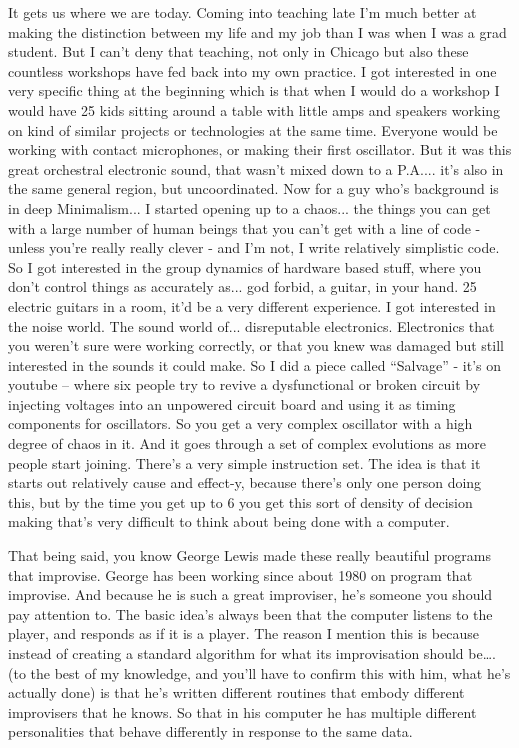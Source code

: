 It gets us where we are today. Coming into teaching late I’m much better at making the distinction between my life and my job than I was when I was a grad student. But I can’t deny that teaching, not only in Chicago but also these countless workshops have fed back into my own practice. I got interested in one very specific thing at the beginning which is that when I would do a workshop I would have 25 kids sitting around a table with little amps and speakers working on kind of similar projects or technologies at the same time. Everyone would be working with contact microphones, or making their first oscillator. But it was this great orchestral electronic sound, that wasn’t mixed down to a P.A.... it’s also in the same general region, but uncoordinated. Now for a guy who’s background is in deep Minimalism... I started opening up to a chaos... the things you can get with a large number of human beings that you can’t get with a line of code - unless you’re really really clever - and I’m not, I write relatively simplistic code. So I got interested in the group dynamics of hardware based stuff, where you don’t control things as accurately as... god forbid, a guitar, in your hand. 25 electric guitars in a room, it’d be a very different experience. I got interested in the noise world. The sound world of... disreputable electronics. Electronics that you weren’t sure were working correctly, or that you knew was damaged but still interested in the sounds it could make.  So I did a piece called ``Salvage'' - it’s on youtube – where six people try to revive a dysfunctional or broken circuit by injecting voltages into an unpowered circuit board and using it as timing components for oscillators. So you get a very complex oscillator with a high degree of chaos in it. And it goes through a set of complex evolutions as more people start joining. There’s a very simple instruction set. The idea is that it starts out relatively cause and effect-y, because there’s only one person doing this, but by the time you get up to 6 you get this sort of density of decision making that’s very difficult to think about being done with a computer.
					
That being said, you know George Lewis made these really beautiful programs that improvise. George has been working since about 1980 on program that improvise. And because he is such a great improviser, he’s someone you should pay attention to. The basic idea’s always been that the computer listens to the player, and responds as if it is a player. The reason I mention this is because instead of creating a standard algorithm for what its improvisation should be…. (to the best of my knowledge, and you’ll have to confirm this with him, what he’s actually done) is that he’s written different routines that embody different improvisers that he knows. So that in his computer he has multiple different personalities that behave differently in response to the same data.
					

